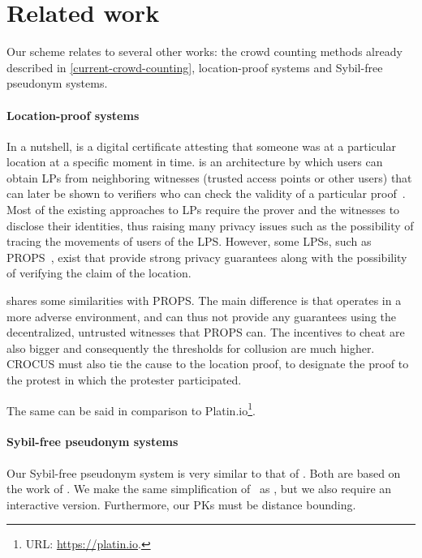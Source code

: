 \section{Related work}%
\label{related-work}

Our scheme relates to several other works: the crowd counting methods already 
described in \cref{current-crowd-counting}, location-proof systems and 
Sybil-free pseudonym systems.

\paragraph*{Location-proof systems}%
\label{db-and-lp}

In a nutshell,  is a digital certificate attesting that someone was at 
a particular location at a specific moment in time.
 is an architecture by which users can obtain \acp{LP} from 
neighboring witnesses (\eg trusted access points or other users) that can later 
be shown to verifiers who can check the validity of a particular 
proof~\cite{luo2010veriplace,zhu2011applaus}.
Most of the existing approaches to \acp{LP} require the prover and the 
witnesses to disclose their identities, thus raising many privacy issues such 
as the possibility of tracing the movements of users of the \ac{LPS}.
However, some \acp{LPS}, such as PROPS~\cite{PROPS}, exist that provide strong 
privacy guarantees along with the possibility of verifying the claim of the 
location.

\CROCUS shares some similarities with PROPS\@.
The main difference is that \CROCUS operates in a more adverse environment, and 
can thus not provide any guarantees using the decentralized, untrusted 
witnesses that PROPS can.
The incentives to cheat are also bigger and consequently the thresholds for 
collusion are much higher.
CROCUS must also tie the cause to the location proof, to designate the proof to 
the protest in which the protester participated.

The same can be said in comparison to Platin.io\footnote{%
  URL: \url{https://platin.io}.
}.

\paragraph*{Sybil-free pseudonym systems}

Our Sybil-free pseudonym system is very similar to that of 
\textcite{SybilFreePseudonyms}.
Both are based on the work of \textcite{HowToWinTheCloneWars}.
We make the same simplification of~\cite{HowToWinTheCloneWars} as 
\textcite{SybilFreePseudonyms}, but we also require an interactive version.
Furthermore, our \acp{PK} must be distance bounding.
